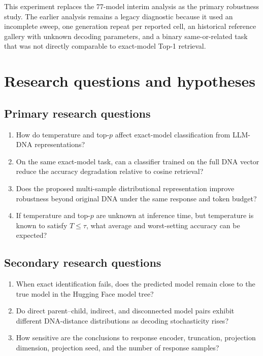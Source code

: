 \documentclass[11pt,a4paper]{article}
\begin{document}
This experiment replaces the 77-model interim analysis as the primary
robustness study. The earlier analysis remains a legacy diagnostic because it
used an incomplete sweep, one generation repeat per reported cell, an
historical reference gallery with unknown decoding parameters, and a binary
same-or-related task that was not directly comparable to exact-model Top-1
retrieval.

\section{Research questions and hypotheses}

\subsection{Primary research questions}

\begin{enumerate}[label=\textbf{RQ\arabic*.}]
  \item How do temperature and top-$p$ affect exact-model classification from
        LLM-DNA representations?
  \item On the same exact-model task, can a classifier trained on the full DNA
        vector reduce the accuracy degradation relative to cosine retrieval?
  \item Does the proposed multi-sample distributional representation improve
        robustness beyond original DNA under the same response and token
        budget?
  \item If temperature and top-$p$ are unknown at inference time, but
        temperature is known to satisfy $T\leq\tau$, what average and
        worst-setting accuracy can be expected?
\end{enumerate}

\subsection{Secondary research questions}

\begin{enumerate}[label=\textbf{SRQ\arabic*.}]
  \item When exact identification fails, does the predicted model remain close
        to the true model in the Hugging Face model tree?
  \item Do direct parent--child, indirect, and disconnected model pairs exhibit
        different DNA-distance distributions as decoding stochasticity rises?
  \item How sensitive are the conclusions to response encoder, truncation,
        projection dimension, projection seed, and the number of response
        samples?
\end{enumerate}
\end{document}
